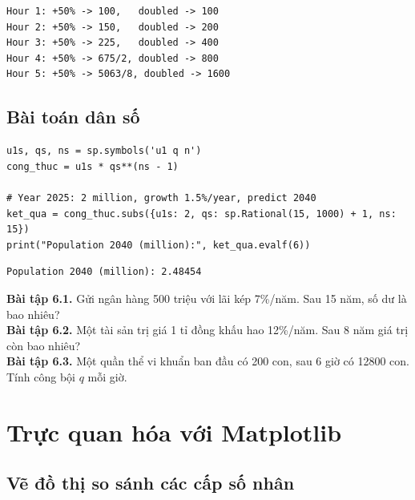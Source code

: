 \documentclass[12pt,a4paper]{report}
\begin{document}
\begin{lstlisting}[style=outstyle,caption={Kết quả (rút gọn)}]
Hour 1: +50% -> 100,   doubled -> 100
Hour 2: +50% -> 150,   doubled -> 200
Hour 3: +50% -> 225,   doubled -> 400
Hour 4: +50% -> 675/2, doubled -> 800
Hour 5: +50% -> 5063/8, doubled -> 1600
\end{lstlisting}

\section{Bài toán dân số}

\begin{lstlisting}[caption={Dự báo dân số với tỉ lệ tăng 1.5\%/năm}]
u1s, qs, ns = sp.symbols('u1 q n')
cong_thuc = u1s * qs**(ns - 1)

# Year 2025: 2 million, growth 1.5%/year, predict 2040
ket_qua = cong_thuc.subs({u1s: 2, qs: sp.Rational(15, 1000) + 1, ns: 15})
print("Population 2040 (million):", ket_qua.evalf(6))
\end{lstlisting}

\begin{lstlisting}[style=outstyle,numbers=none]
Population 2040 (million): 2.48454
\end{lstlisting}

\begin{exbox}
\textbf{Bài tập 6.1.} Gửi ngân hàng 500 triệu với lãi kép 7\%/năm. Sau
15 năm, số dư là bao nhiêu?\\[2pt]
\textbf{Bài tập 6.2.} Một tài sản trị giá 1 tỉ đồng khấu hao 12\%/năm.
Sau 8 năm giá trị còn bao nhiêu?\\[2pt]
\textbf{Bài tập 6.3.} Một quần thể vi khuẩn ban đầu có 200 con, sau 6
giờ có 12800 con. Tính công bội $q$ mỗi giờ.
\end{exbox}

\newpage

\chapter{Trực quan hóa với Matplotlib}

\section{Vẽ đồ thị so sánh các cấp số nhân}
\end{document}
